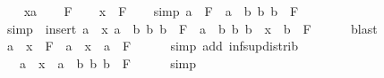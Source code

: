 \begin{isabellebody}
\ \ \isamarkupfalse%
\ x{\isacharcolon}{\kern0pt}{\isacharcolon}{\kern0pt}{\isachardoublequoteopen}{\isacharprime}{\kern0pt}a{\isachardoublequoteclose}\isanewline
\ \ \isamarkupfalse%
\ F\isanewline
\ \ \isamarkupfalse%
\ {\isachardoublequoteopen}x\ {\isasymnotin}\ F{\isachardoublequoteclose}\isanewline
\ \ \isamarkupfalse%
\ {\isacharbrackleft}{\kern0pt}simp{\isacharbrackright}{\kern0pt}{\isacharcolon}{\kern0pt}\ {\isachardoublequoteopen}a\ {\isasymsqinter}\ {\isasymSqunion}F\ {\isacharequal}{\kern0pt}\ {\isasymSqunion}{\isacharbraceleft}{\kern0pt}a\ {\isasymsqinter}\ b\ {\isacharbar}{\kern0pt}b{\isachardot}{\kern0pt}\ b\ {\isasymin}\ F{\isacharbraceright}{\kern0pt}{\isachardoublequoteclose}\isanewline
\ \ \isamarkupfalse%
\ {\isacharbrackleft}{\kern0pt}simp{\isacharbrackright}{\kern0pt}{\isacharcolon}{\kern0pt}\ {\isachardoublequoteopen}\ insert\ {\isacharparenleft}{\kern0pt}a\ {\isasymsqinter}\ x{\isacharparenright}{\kern0pt}\ {\isacharbraceleft}{\kern0pt}a\ {\isasymsqinter}\ b\ {\isacharbar}{\kern0pt}b{\isachardot}{\kern0pt}\ b\ {\isasymin}\ F{\isacharbraceright}{\kern0pt}\ {\isacharequal}{\kern0pt}\ {\isacharbraceleft}{\kern0pt}a\ {\isasymsqinter}\ b\ {\isacharbar}{\kern0pt}b{\isachardot}{\kern0pt}\ b\ {\isacharequal}{\kern0pt}\ x\ {\isasymor}\ b\ {\isasymin}\ F{\isacharbraceright}{\kern0pt}{\isachardoublequoteclose}\isanewline
\ \ \ \ \isamarkupfalse%
\ blast\isanewline
\ \ \isamarkupfalse%
\ {\isachardoublequoteopen}a\ {\isasymsqinter}\ {\isacharparenleft}{\kern0pt}x\ {\isasymsqunion}\ {\isasymSqunion}F{\isacharparenright}{\kern0pt}\ {\isacharequal}{\kern0pt}\ a\ {\isasymsqinter}\ x\ {\isasymsqunion}\ a\ {\isasymsqinter}\ {\isasymSqunion}F{\isachardoublequoteclose}\isanewline
\ \ \ \ \isamarkupfalse%
\ {\isacharparenleft}{\kern0pt}simp\ add{\isacharcolon}{\kern0pt}\ inf{\isacharunderscore}{\kern0pt}sup{\isacharunderscore}{\kern0pt}distrib{}{\isacharparenright}{\kern0pt}\isanewline
\ \ \isamarkupfalse%
\ \isamarkupfalse%
\ {\isachardoublequoteopen}{\isachardot}{\kern0pt}{\isachardot}{\kern0pt}{\isachardot}{\kern0pt}\ {\isacharequal}{\kern0pt}\ a\ {\isasymsqinter}\ x\ {\isasymsqunion}\ {\isasymSqunion}{\isacharbraceleft}{\kern0pt}a\ {\isasymsqinter}\ b\ {\isacharbar}{\kern0pt}b{\isachardot}{\kern0pt}\ b\ {\isasymin}\ F{\isacharbraceright}{\kern0pt}{\isachardoublequoteclose}\isanewline
\ \ \ \ \isamarkupfalse%
\ simp\isanewline
\ \ \isamarkupfalse%

\end{isabellebody}
